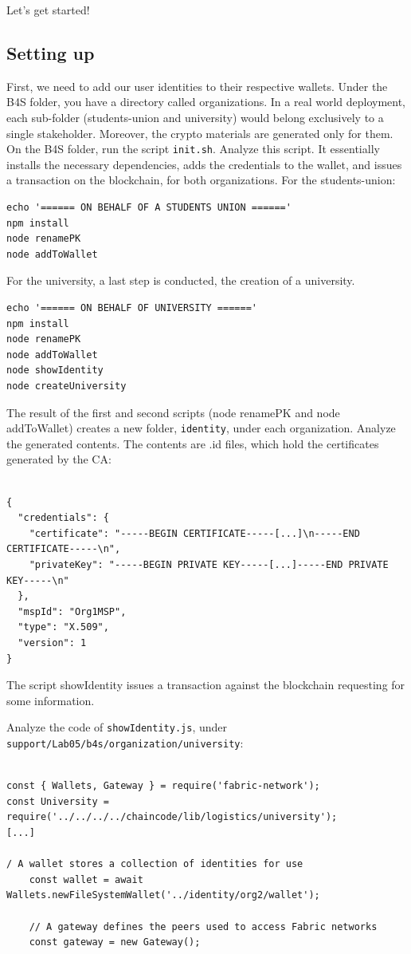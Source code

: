 \documentclass[12pt,a4paper]{article}
\theoremstyle{definition}
\begin{document}
Let's get started!

\subsection{Setting up}
First, we need to add our user identities to their respective wallets. Under the B4S folder, you have a directory called organizations. In a real world deployment, each sub-folder (students-union and university) would belong exclusively to a single stakeholder. Moreover, the crypto materials are generated only for them. On the B4S folder, run the script \texttt{init.sh}. Analyze this script. It essentially installs the necessary dependencies, adds the credentials to the wallet, and issues a transaction on the blockchain, for both organizations. For the students-union:

\begin{verbatim}
echo '====== ON BEHALF OF A STUDENTS UNION ======'
npm install
node renamePK
node addToWallet
\end{verbatim}

For the university, a last step is conducted, the creation of a university.
\begin{verbatim}
echo '====== ON BEHALF OF UNIVERSITY ======'
npm install
node renamePK
node addToWallet
node showIdentity
node createUniversity
\end{verbatim}


The result of the first and second scripts (node renamePK and node addToWallet) creates a new folder, \texttt{identity}, under each organization. Analyze the generated contents. The contents are .id files, which hold the certificates generated by the CA:

\begin{verbatim}

{
  "credentials": {
    "certificate": "-----BEGIN CERTIFICATE-----[...]\n-----END CERTIFICATE-----\n",
    "privateKey": "-----BEGIN PRIVATE KEY-----[...]-----END PRIVATE KEY-----\n"
  },
  "mspId": "Org1MSP",
  "type": "X.509",
  "version": 1
}
\end{verbatim}

The script showIdentity issues a transaction against the blockchain requesting for some information.

Analyze the code of \texttt{showIdentity.js}, under \texttt{support/Lab05/b4s/organization/university}:

\begin{verbatim}

const { Wallets, Gateway } = require('fabric-network');
const University = require('../../../../chaincode/lib/logistics/university');
[...]

/ A wallet stores a collection of identities for use
    const wallet = await Wallets.newFileSystemWallet('../identity/org2/wallet');

    // A gateway defines the peers used to access Fabric networks
    const gateway = new Gateway();
\end{verbatim}
\end{document}
